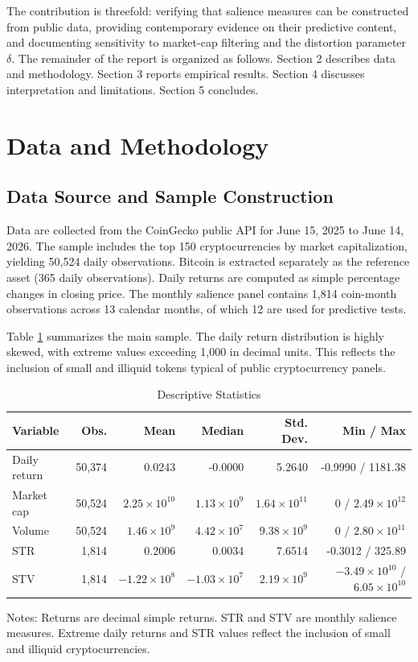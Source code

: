 \documentclass[11pt]{article}
\begin{document}
The contribution is threefold: verifying that salience measures can be constructed from public data, providing contemporary evidence on their predictive content, and documenting sensitivity to market-cap filtering and the distortion parameter $\delta$. The remainder of the report is organized as follows. Section 2 describes data and methodology. Section 3 reports empirical results. Section 4 discusses interpretation and limitations. Section 5 concludes.

\section{Data and Methodology}

\subsection{Data Source and Sample Construction}

Data are collected from the CoinGecko public API for June 15, 2025 to June 14, 2026. The sample includes the top 150 cryptocurrencies by market capitalization, yielding 50,524 daily observations. Bitcoin is extracted separately as the reference asset (365 daily observations). Daily returns are computed as simple percentage changes in closing price. The monthly salience panel contains 1,814 coin-month observations across 13 calendar months, of which 12 are used for predictive tests.

Table \ref{tab:desc} summarizes the main sample. The daily return distribution is highly skewed, with extreme values exceeding 1,000 in decimal units. This reflects the inclusion of small and illiquid tokens typical of public cryptocurrency panels.

\begin{table}[htbp]
\centering
\small
\singlespacing
\caption{Descriptive Statistics}
\label{tab:desc}
\begin{tabular}{lrrrrr}
\toprule
Variable & Obs. & Mean & Median & Std. Dev. & Min / Max \\
\midrule
Daily return & 50,374 & 0.0243 & -0.0000 & 5.2640 & -0.9990 / 1181.38 \\
Market cap & 50,524 & $2.25\times10^{10}$ & $1.13\times10^{9}$ & $1.64\times10^{11}$ & 0 / $2.49\times10^{12}$ \\
Volume & 50,524 & $1.46\times10^{9}$ & $4.42\times10^{7}$ & $9.38\times10^{9}$ & 0 / $2.80\times10^{11}$ \\
STR & 1,814 & 0.2006 & 0.0034 & 7.6514 & -0.3012 / 325.89 \\
STV & 1,814 & $-1.22\times10^{8}$ & $-1.03\times10^{7}$ & $2.19\times10^{9}$ & $-3.49\times10^{10}$ / $6.05\times10^{10}$ \\
\bottomrule
\end{tabular}
\begin{flushleft}
\footnotesize Notes: Returns are decimal simple returns. STR and STV are monthly salience measures. Extreme daily returns and STR values reflect the inclusion of small and illiquid cryptocurrencies.
\end{flushleft}
\end{table}
\end{document}
